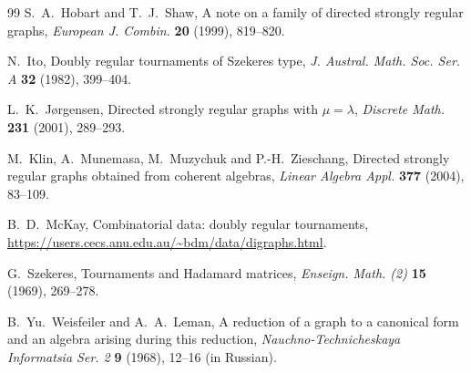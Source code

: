 \documentclass[11pt]{article}
\theoremstyle{definition}
\theoremstyle{remark}
\begin{document}
\begin{thebibliography}{99}
S.~A.~Hobart and T.~J.~Shaw,
A note on a family of directed strongly regular graphs,
\emph{European J. Combin.} \textbf{20} (1999), 819--820.

N.~Ito, Doubly regular tournaments of Szekeres type,
\emph{J. Austral. Math. Soc. Ser. A} \textbf{32} (1982), 399--404.

L.~K.~J\o rgensen, Directed strongly regular graphs with $\mu=\lambda$,
\emph{Discrete Math.} \textbf{231} (2001), 289--293.

M.~Klin, A.~Munemasa, M.~Muzychuk and P.-H.~Zieschang,
Directed strongly regular graphs obtained from coherent algebras,
\emph{Linear Algebra Appl.} \textbf{377} (2004), 83--109.

B.~D.~McKay,
Combinatorial data: doubly regular tournaments,
\url{https://users.cecs.anu.edu.au/~bdm/data/digraphs.html}.

G.~Szekeres, Tournaments and Hadamard matrices,
\emph{Enseign. Math. (2)} \textbf{15} (1969), 269--278.

B.~Yu.~Weisfeiler and A.~A.~Leman,
A reduction of a graph to a canonical form and an algebra arising during this
reduction,
\emph{Nauchno-Technicheskaya Informatsia Ser. 2} \textbf{9} (1968), 12--16
(in Russian).

\end{thebibliography}
\end{document}

